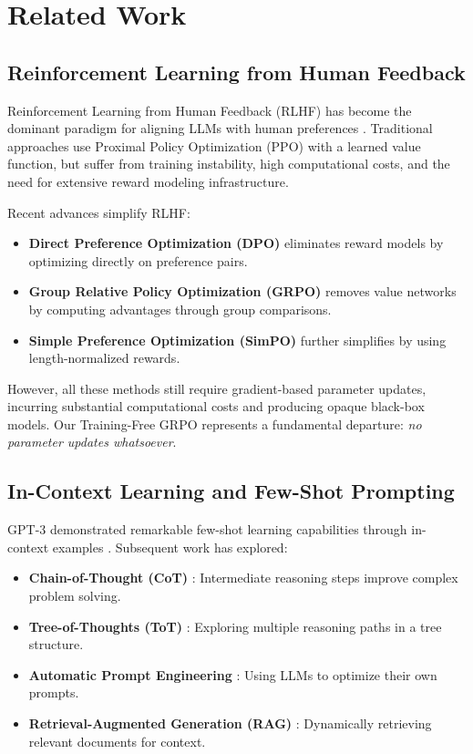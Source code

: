 \section{Related Work}


\subsection{Reinforcement Learning from Human Feedback}

Reinforcement Learning from Human Feedback (RLHF) has become the dominant paradigm for aligning LLMs with human preferences \cite{ouyang2022training,bai2022constitutional}. Traditional approaches use Proximal Policy Optimization (PPO) \cite{schulman2017proximal} with a learned value function, but suffer from training instability, high computational costs, and the need for extensive reward modeling infrastructure.

Recent advances simplify RLHF:
\begin{itemize}
    \item \textbf{Direct Preference Optimization (DPO)} \cite{rafailov2023direct} eliminates reward models by optimizing directly on preference pairs.
    \item \textbf{Group Relative Policy Optimization (GRPO)} \cite{shao2024deepseekmath} removes value networks by computing advantages through group comparisons.
    \item \textbf{Simple Preference Optimization (SimPO)} \cite{meng2024simpo} further simplifies by using length-normalized rewards.
\end{itemize}

However, all these methods still require gradient-based parameter updates, incurring substantial computational costs and producing opaque black-box models. Our Training-Free GRPO represents a fundamental departure: \textit{no parameter updates whatsoever}.

\subsection{In-Context Learning and Few-Shot Prompting}

GPT-3 demonstrated remarkable few-shot learning capabilities through in-context examples \cite{brown2020language}. Subsequent work has explored:
\begin{itemize}
    \item \textbf{Chain-of-Thought (CoT)} \cite{wei2022chain}: Intermediate reasoning steps improve complex problem solving.
    \item \textbf{Tree-of-Thoughts (ToT)} \cite{yao2023tree}: Exploring multiple reasoning paths in a tree structure.
    \item \textbf{Automatic Prompt Engineering} \cite{zhou2022large}: Using LLMs to optimize their own prompts.
    \item \textbf{Retrieval-Augmented Generation (RAG)} \cite{lewis2020retrieval}: Dynamically retrieving relevant documents for context.
\end{itemize}

